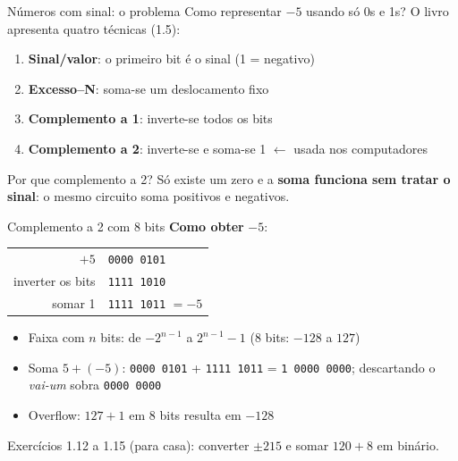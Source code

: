 \documentclass[aspectratio=169,10pt,t]{beamer}
\begin{document}
\begin{frame}{Números com sinal: o problema}
  Como representar \(-5\) usando só 0s e 1s? O livro apresenta quatro técnicas (1.5):
  \begin{enumerate}
    \item \textbf{Sinal/valor}: o primeiro bit é o sinal (1 = negativo)
    \item \textbf{Excesso--N}: soma-se um deslocamento fixo
    \item \textbf{Complemento a 1}: inverte-se todos os bits
    \item \textbf{Complemento a 2}: inverte-se e soma-se 1 \hfill {\small\(\leftarrow\) usada nos computadores}
  \end{enumerate}
  \vspace{1ex}
  \begin{block}{Por que complemento a 2?}
    Só existe um zero e a \textbf{soma funciona sem tratar o sinal}: o mesmo circuito soma positivos e negativos.
  \end{block}
\end{frame}

\begin{frame}{Complemento a 2 com 8 bits}
  \textbf{Como obter} \(-5\):
  \begin{center}\small
    \begin{tabular}{rl}
      \(+5\) & \texttt{0000 0101}\\
      inverter os bits & \texttt{1111 1010}\\
      somar 1 & \texttt{1111 1011} \(= -5\)
    \end{tabular}
  \end{center}
  \begin{itemize}
    \item Faixa com \(n\) bits: de \(-2^{n-1}\) a \(2^{n-1}-1\) (8 bits: \(-128\) a \(127\))
    \item Soma \(5 + (-5)\): \texttt{0000 0101} + \texttt{1111 1011} = \texttt{1 0000 0000}; descartando o \emph{vai-um} sobra \texttt{0000 0000}
    \item \alert{Overflow:} \(127+1\) em 8 bits resulta em \(-128\)
  \end{itemize}
  \footnotesize Exercícios 1.12 a 1.15 (para casa): converter \(\pm 215\) e somar \(120+8\) em binário.
\end{frame}
\end{document}

